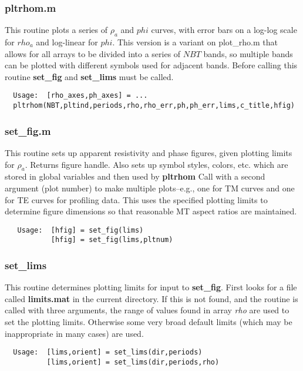 \subsubsection{pltrhom.m}

This routine
plots a series of $\rho_a$ and $phi$ curves, with error bars on
a log-log scale for $rho_a$ and log-linear for $phi$.
This version is a variant on plot\_rho.m that allows for all arrays
to be divided into a series of $NBT$ bands, so multiple bands can
be plotted with different symbols used for adjacent bands.
Before calling this routine {\bf set\_fig} and {\bf set\_lims} must
be called.

\small
\begin{verbatim}
  Usage:  [rho_axes,ph_axes] = ...
  pltrhom(NBT,pltind,periods,rho,rho_err,ph,ph_err,lims,c_title,hfig)
\end{verbatim}
\normalsize

\subsubsection{set\_fig.m}
This routine
sets up apparent resistivity and phase figures,
given plotting limits for $\rho_a$.
Returns figure handle.  Also sets up symbol styles,
colors, etc. which are stored in global variables and then
used by {\bf pltrhom}
Call with a second argument (plot number) to make multiple plots--e.g.,
one for TM curves and one for TE curves for profiling data.
This uses the specified plotting limits to determine figure
dimensions so that reasonable MT aspect ratios are maintained.

\small
\begin{verbatim}
   Usage:  [hfig] = set_fig(lims)
           [hfig] = set_fig(lims,pltnum)
\end{verbatim}
\normalsize

\subsubsection{set\_lims}
This routine determines plotting limits for input to {\bf set\_fig}.
First looks for a file called {\bf limits.mat} in the current
directory.  If this is not found, and the routine is called with
three arguments, the range of values found in array {\it rho}
are used to set the plotting limits.  Otherwise some very broad
default limits (which may be inappropriate in many cases) are used.

\small
\begin{verbatim}
  Usage:  [lims,orient] = set_lims(dir,periods)
          [lims,orient] = set_lims(dir,periods,rho)
\end{verbatim}
\normalsize

